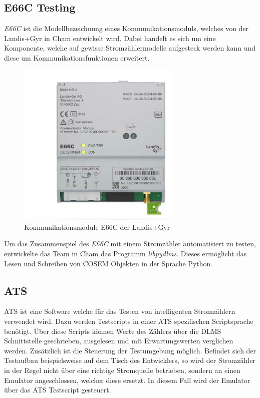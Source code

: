 \subsection{E66C Testing}\label{pythonTesting}
\textit{E66C} ist die Modellbezeichnung eines Kommunikationsmoduls, welches von der Landis+Gyr in Cham entwickelt wird.
Dabei handelt es sich um eine Komponente, welche auf gewisse Stromzählermodelle aufgesteck werden kann und diese um Kommunikationsfunktionen erweitert.

\begin{figure}[H]
   \centering
   \includegraphics[width=0.7\textwidth]{gfx/landis-e66c.jpg}
   \caption{
      Kommunikationsmodule E66C der Landis+Gyr
   }
   \label{fig:e66c}
\end{figure}

Um das Zusammenspiel des \textit{E66C} mit einem Stromzähler automatisiert zu testen, entwickelte das Team in Cham das Programm \textit{libpydlms}.
Dieses ermöglicht das Lesen und Schreiben von \ac{COSEM} Objekten in der Sprache Python.


\subsection{ATS}\label{ats}
\ac{ATS} ist eine Software welche für das Testen von intelligenten Stromzählern verwendet wird.
Dazu werden Testscripts in einer \ac{ATS} spezifischen Scriptsprache benötigt.
Über diese Scripts können Werte des Zählers über die \ac{DLMS} Schnittstelle geschrieben, ausgelesen und mit Erwartungswerten verglichen werden.
Zusätzlich ist die Steuerung der Testumgebung möglich.
Befindet sich der Testaufbau beispielsweise auf dem Tisch des Entwicklers, so wird der Stromzähler in der Regel nicht über eine richtige Stromquelle betrieben, sondern an einen Emulator angeschlossen, welcher diese ersetzt.
In diesem Fall wird der Emulator über das \ac{ATS} Testscript gesteuert.

